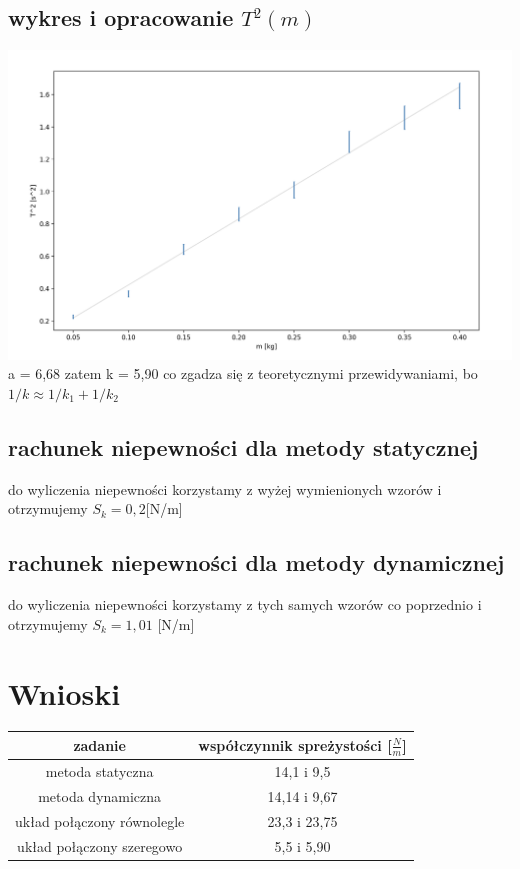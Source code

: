 \documentclass{article}
\begin{document}
\subsection{wykres i opracowanie $T^2(m)$}
\includegraphics[width=15cm]{m7_2_2}
a = 6,68 zatem k = 5,90 co zgadza się z teoretycznymi przewidywaniami, bo $1/k \approx 1/k_1 + 1/k_2$

\subsection{rachunek niepewności dla metody statycznej}
do wyliczenia niepewności korzystamy z wyżej wymienionych wzorów i otrzymujemy 
$S_k = 0,2 $[N/m]

\subsection{rachunek niepewności dla metody dynamicznej}
do wyliczenia niepewności korzystamy z tych samych wzorów co poprzednio i otrzymujemy
$S_k = 1, 01$ [N/m]


\section{Wnioski}

\begin{center}
\begin{tabular}{ c | c }
zadanie & współczynnik spreżystości [$\frac{N}{m}$]  \\


\hline
 metoda statyczna  & 14,1 i 9,5\\  
 metoda dynamiczna & 14,14 i 9,67 \\
 układ połączony równolegle& 23,3 i 23,75 \\
 układ połączony szeregowo & 5,5 i 5,90 
\end{tabular}
\end{center}
\end{document}
